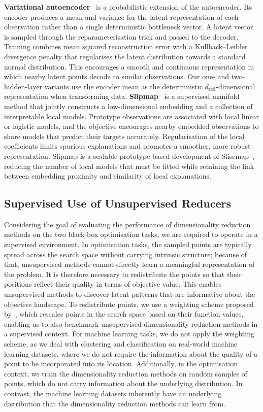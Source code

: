     \noindent \textbf{Variational autoencoder}~\citep{KinWel14} is a probabilistic extension of the autoencoder. Its encoder produces a mean and variance for the latent representation of each observation rather than a single deterministic bottleneck vector. A latent vector is sampled through the reparameterisation trick and passed to the decoder. Training combines mean squared reconstruction error with a Kullback--Leibler divergence penalty that regularises the latent distribution towards a standard normal distribution. This encourages a smooth and continuous representation in which nearby latent points decode to similar observations. Our one- and two-hidden-layer variants use the encoder mean as the deterministic $d_{\mathrm{red}}$-dimensional representation when transforming data.
\noindent \textbf{Slipmap}~\citep{BjoEtAl24} is a supervised manifold method that jointly constructs a low-dimensional embedding and a collection of interpretable local models. Prototype observations are associated with local linear or logistic models, and the objective encourages nearby embedded observations to share models that predict their targets accurately. Regularisation of the local coefficients limits spurious explanations and promotes a smoother, more robust representation. Slipmap is a scalable prototype-based development of Slisemap~\citep{BjoEtAl23},
reducing the number of local models that must be fitted while retaining the link between embedding proximity and similarity of local explanations.

\subsection{Supervised Use of Unsupervised Reducers}
\label{sec:ch05:transform}
Considering the goal of evaluating the performance of dimensionality reduction methods on the two black-box optimisation tasks, we are required to operate in a supervised environment.
In optimisation tasks, the sampled points are typically spread across the search space without carrying intrinsic structure; because of that, unsupervised methods cannot directly learn a meaningful representation of the problem. It is therefore necessary to redistribute the points so that their positions reflect their quality in terms of objective value. This enables unsupervised methods to discover latent patterns that are informative about the objective landscape.
To redistribute points, we use a weighting scheme proposed by~\citet{RapEtAl20}, which rescales points in the search space based on their function values, enabling us to also benchmark unsupervised dimensionality reduction methods in a supervised context.
For machine learning tasks, we do not apply the weighting scheme, as we deal with clustering and classification on real-world machine learning datasets, where we do not require the information about the quality of a point to be incorporated into its location. Additionally, in the optimisation context, we train the dimensionality reduction methods on random samples of points, which do not carry information about the underlying distribution.
In contrast, the machine learning datasets inherently have an underlying distribution that the dimensionality reduction methods can learn from.

